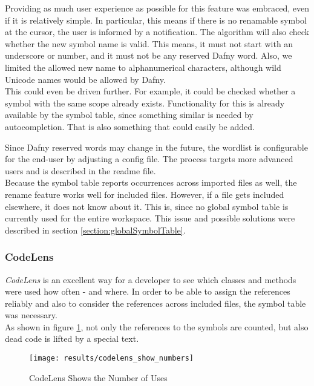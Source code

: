 Providing as much user experience as possible for this feature was embraced, even if it is relatively simple.
In particular, this means if there is no renamable symbol at the cursor, the user is informed by a notification.
The algorithm will also check whether the new symbol name is valid.
This means, it must not start with an underscore or number, and it must not be any reserved Dafny word.
Also, we limited the allowed new name to alphanumerical characters, although wild Unicode names would be allowed by Dafny.\\

This could even be driven further.
For example, it could be checked whether a symbol with the same scope already exists.
Functionality for this is already available by the symbol table, since something similar is needed by autocompletion.
That is also something that could easily be added.

Since Dafny reserved words may change in the future, the wordlist is configurable for the end-user by adjusting a config file.
The process targets more advanced users and is described in the readme file.\\

Because the symbol table reports occurrences across imported files as well, the rename feature works well for included files.
However, if a file gets included elsewhere, it does not know about it.
This is, since no global symbol table is currently used for the entire workspace.
This issue and possible solutions were described in section \ref{section:globalSymbolTable}.\\

\subsubsection{CodeLens}
\textit{CodeLens} is an excellent way for a developer to see which classes and methods were used how often - and where.
In order to be able to assign the references reliably and
also to consider the references across included files, the symbol table was necessary. \\

As shown in figure \ref{fig:result_codelens_references},
not only the references to the symbols are counted,
but also dead code is lifted by a special text.

\begin{figure}[H]
    \centering
    \texttt{[image: results/codelens\_show\_numbers]}
    \caption{CodeLens Shows the Number of Uses}
    \label{fig:result_codelens_references}
\end{figure}

